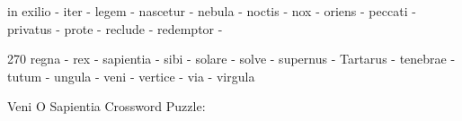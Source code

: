 \documentclass[12pt]{article}
\begin{document}
\pagestyle{fancy}
\fancyhf{}
\renewcommand{\headrulewidth}{0pt} %
  \renewcommand{\footrulewidth}{0pt}
\libertine
\renewcommand\PuzzleClueFont{\rm\normalsize}
\noindent\begin{rotate}{0}\small  in exilio -  iter -  legem -  nascetur -  nebula -  noctis -  nox -  oriens -  peccati -  privatus -  prote -  reclude -  redemptor - 
\end{rotate} 
\hfill
\begin{rotate}{270}
\small regna -  rex -   sapientia -  sibi -  solare -  solve -  supernus -  Tartarus -  tenebrae -  tutum -  ungula -  veni -  vertice -  via -  virgula  
\end{rotate}
\begin{center}
  \huge{Veni O Sapientia Crossword Puzzle:}
\end{center}
\vspace{1.5cm}
\end{document}
